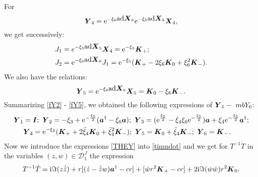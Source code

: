\documentclass[12pt]{amsart}
\numberwithin{equation}{section}
\theoremstyle{definition}
\begin{document}
For $${{\mbox{\boldmath{${Y}$}}}}_4={{\mbox{\rm e}}}^{-\xi_6{{\mbox{\rm ad}}}{{\mbox{\boldmath{${X}$}}}}_6}e^{-\xi_5{{\mbox{\rm ad}}}{{\mbox{\boldmath{${X}$}}}}_5}{{\mbox{\boldmath{${X}$}}}}_4,$$
we get successively:
\begin{equation}
\begin{split}\label{fY4}
J_1 &= e^{-\xi_5{{\mbox{\rm ad}}}{{\mbox{\boldmath{${X}$}}}}_5}{{\mbox{\boldmath{${X}$}}}}_4 = {{\mbox{\rm e}}}^{-\xi_5}
{{\mbox{\boldmath{${K}$}}}}_+;\\
J_2 & = {{\mbox{\rm e}}}^{-\xi_6{{\mbox{\rm ad}}}{{\mbox{\boldmath{${X}$}}}}_6}J_1= {{\mbox{\rm e}}}^{-\xi_5}(
{{\mbox{\boldmath{${K}$}}}}_+-2\xi_6{{\mbox{\boldmath{${K}$}}}}_0+\xi_6^2{{\mbox{\boldmath{${K}$}}}}_-).
\\
\end{split}
\end{equation}
We also have the relations:
\begin{equation}\label{fY5}
{{\mbox{\boldmath{${Y}$}}}}_5={{\mbox{\rm e}}}^{-\xi_6{{\mbox{\rm ad}}}{{\mbox{\boldmath{${X}$}}}}_6}{{\mbox{\boldmath{${X}$}}}}_5= {{\mbox{\boldmath{${K}$}}}}_0-\xi_6{{\mbox{\boldmath{${K}$}}}}_-.
\end{equation}
Summarizing \eqref{fY2} - \eqref{fY5}, we  obtained the following  expressions
of ${{\mbox{\boldmath{${Y}$}}}}_1 -\ mb{Y}_6$: 
\begin{equation}\label{THEY}
\begin{split}
{{\mbox{\boldmath{${Y}$}}}}_1& ={{\mbox{\boldmath{${I}$}}}};~{{\mbox{\boldmath{${Y}$}}}}_2= -\xi_3+{{\mbox{\rm e}}}^{-\frac{\xi_5}{2}}({{\mbox{\boldmath{${a}$}}}}^{\dagger}-\xi_6{{\mbox{\boldmath{${a}$}}}});~ {{\mbox{\boldmath{${Y}$}}}}_3=
({{\mbox{\rm e}}}^{\frac{\xi_5}{2}}-\xi_4\xi_6 {{\mbox{\rm e}}}^{-\frac{\xi_5}{2}}){{\mbox{\boldmath{${a}$}}}}+\xi_4 {{\mbox{\rm e}}}^{-\frac{\xi_5}{2}}{{\mbox{\boldmath{${a}$}}}}^{\dagger}; \\
&  {{\mbox{\boldmath{${Y}$}}}}_4= {{\mbox{\rm e}}}^{-\xi_5}({{\mbox{\boldmath{${K}$}}}}_++2\bar{\xi}_4{{\mbox{\boldmath{${K}$}}}}_0+\bar{\xi}^2_4{{\mbox{\boldmath{${K}$}}}}_-); ~ {{\mbox{\boldmath{${Y}$}}}}_5= {{\mbox{\boldmath{${K}$}}}}_0+\bar{\xi}_4{{\mbox{\boldmath{${K}$}}}}_-; ~ {{\mbox{\boldmath{${Y}$}}}}_6={{\mbox{\boldmath{${K}$}}}}_ -.
\end{split}
\end{equation}
Now we introduce the expressions \eqref{THEY} into \eqref{timndot} and we
get  for $T^{-1}\dot{T}$  in the variables $(z,w)\in{{\mathcal{{D}}}}^J_1$ the expression 
\begin{equation}\label{minTT}
T^{-1}\dot{T}={\operatorname{i}} \Im(z\dot{\bar{z}}) +r[(\dot{z}-\dot{\bar{z}}w){{\mbox{\boldmath{${a}$}}}}^{\dagger}-cc ] +[\dot{w}r^2{{\mbox{\boldmath{${K}$}}}}_+-cc]
+2{\operatorname{i}} \Im (\dot{w}\bar{w})r^2{{\mbox{\boldmath{${K}$}}}}_0 .
\end{equation}
\end{document}
